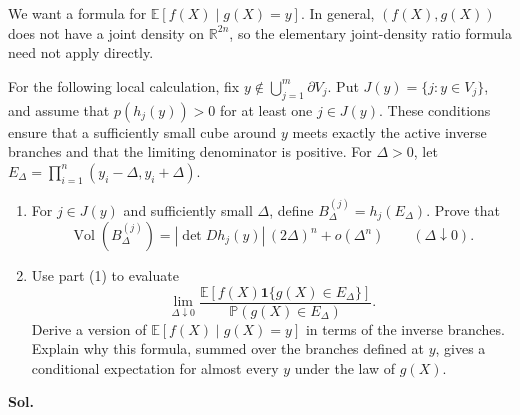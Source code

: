 \documentclass[lang=en,11pt,a4paper,citestyle=authoryear]{elegantpaper}
\newcommand{\R}{\mathbb{R}}
\newcommand{\E}{\mathbb{E}}
\renewcommand{\P}{\mathbb{P}}
\begin{document}
We want a formula for $\E[f(X)\mid g(X)=y]$. In general, $(f(X),g(X))$ does not have a joint density on $\R^{2n}$, so the elementary joint-density ratio formula need not apply directly.

For the following local calculation, fix $y\notin\bigcup_{j=1}^m\partial V_j$. Put $J(y)=\{j:y\in V_j\}$, and assume that $p(h_j(y))>0$ for at least one $j\in J(y)$. These conditions ensure that a sufficiently small cube around $y$ meets exactly the active inverse branches and that the limiting denominator is positive. For $\Delta>0$, let $E_\Delta=\prod_{i=1}^n(y_i-\Delta,y_i+\Delta)$.

\begin{enumerate}[label=(\arabic*),leftmargin=*]
\item For $j\in J(y)$ and sufficiently small $\Delta$, define $B_\Delta^{(j)}=h_j(E_\Delta)$. Prove that
\[
\operatorname{Vol}(B_\Delta^{(j)})=|\det Dh_j(y)|\,(2\Delta)^n+o(\Delta^n)\qquad(\Delta\downarrow0).
\]
\item Use part (1) to evaluate
\[
\lim_{\Delta\downarrow0}\frac{\E[f(X)\mathbf{1}\{g(X)\in E_\Delta\}]}{\P(g(X)\in E_\Delta)}.
\]
Derive a version of $\E[f(X)\mid g(X)=y]$ in terms of the inverse branches. Explain why this formula, summed over the branches defined at $y$, gives a conditional expectation for almost every $y$ under the law of $g(X)$.
\end{enumerate}
\vspace{0.5em}
\textbf{Sol.}\par
\end{document}
